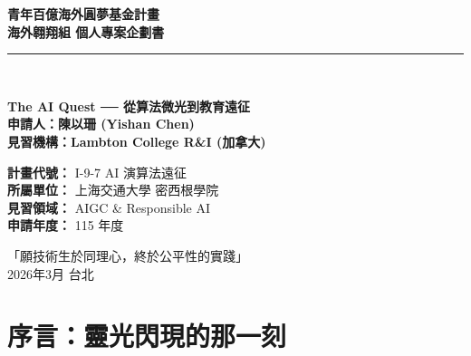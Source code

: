 \documentclass[12pt,a4paper]{article}
\begin{document}
\begin{titlepage}
    \begin{center}
        \vspace*{2cm}
        {\huge \bfseries 青年百億海外圓夢基金計畫} \\
        \vspace{0.5cm}
        {\Large \bfseries 海外翱翔組 \quad 個人專案企劃書} \\
        \vspace{1cm}
        \rule{\textwidth}{1.5pt} \\
        \vspace{1.5cm}
        
        \begin{tcolorbox}[colback=blue!5,colframe=MyBlue,width=0.85\textwidth, arc=5pt]
            \centering \Large \bfseries The AI Quest ── 從算法微光到教育遠征 \\
            \vspace{0.3cm}
            \large 申請人：陳以珊 (Yishan Chen) \\
            \large 見習機構：Lambton College R\&I (加拿大)
        \end{tcolorbox}

        \vspace{2.5cm}

        \begin{minipage}{0.6\textwidth}
            \large
            \textbf{計畫代號：} I-9-7 AI 演算法遠征 \\
            \textbf{所屬單位：} 上海交通大學 密西根學院 \\
            \textbf{見習領域：} AIGC & Responsible AI \\
            \textbf{申請年度：} 115 年度
        \end{minipage}

        \vfill
        {\large 「願技術生於同理心，終於公平性的實踐」} \\
        \vspace{0.5cm}
        {\small 2026年3月 \quad 台北}
    \end{center}
\end{titlepage}

\newpage

\renewcommand{\contentsname}{目錄：遠征的航圖}
\tableofcontents
\newpage

\section{序言：靈光閃現的那一刻}
\end{document}
